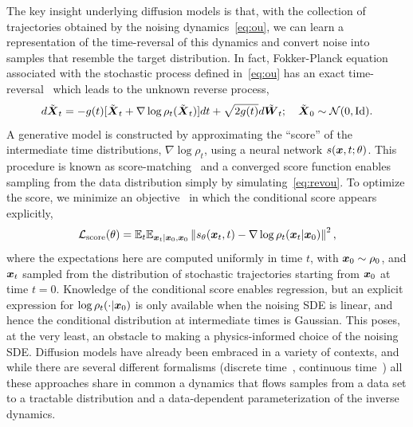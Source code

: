 \documentclass[11pt]{article}
\begin{document}
The key insight underlying diffusion models is that, with the collection of trajectories obtained by the noising dynamics~\eqref{eq:ou}, we can learn a representation of the time-reversal of this dynamics and convert noise into samples that resemble the target distribution.
In fact, Fokker-Planck equation associated with the stochastic process defined in~\eqref{eq:ou} has an exact time-reversal~\cite{anderson_reverse-time_1982,song_score-based_2022} which leads to the unknown reverse process,
\begin{equation}
    d\tilde{\boldsymbol{X}}_t = -g(t)[\tilde{\boldsymbol{X}}_t + \nabla \log \rho_t(\tilde{\boldsymbol{X}}_t)] dt + \sqrt{2 g(t)} d\tilde{\boldsymbol{W}}_t; \quad \tilde{\boldsymbol{X}}_0\sim \mathcal{N}(0,\rm{Id}).
    \label{eq:revou}
\end{equation}
A generative model is constructed by approximating the ``score'' of the intermediate time distributions, $\nabla \log \rho_t$, using a neural network $s(\boldsymbol{x}, t; \theta)$.
This procedure is known as score-matching~\cite{song_score-based_2022} and a converged score function enables sampling from the data distribution simply by simulating~\eqref{eq:revou}.
To optimize the score, we minimize an objective~\cite{song_score-based_2022} in which the conditional score appears explicitly,
\begin{equation}
    \mathcal{L}_{\rm score}(\theta) = \mathbb{E}_t \mathbb{E}_{\boldsymbol{x}_t| \boldsymbol{x}_0, \boldsymbol{x}_0} \left\| s_{\theta}(\boldsymbol{x}_t, t) - \nabla \log \rho_t (\boldsymbol{x}_t | \boldsymbol{x}_0) \right\|^2,
\end{equation}
where the expectations here are computed uniformly in time $t$, with $\boldsymbol{x}_0 \sim \rho_0$, and $\boldsymbol{x}_t$ sampled from the distribution of stochastic trajectories starting from $\boldsymbol{x}_0$ at time $t=0.$
Knowledge of the conditional score enables regression, but an explicit expression for $\log \rho_t (\cdot | \boldsymbol{x}_0)$ is only available when the noising SDE is linear, and hence the conditional distribution at intermediate times is Gaussian.
This poses, at the very least, an obstacle to making a physics-informed choice of the noising SDE. 
Diffusion models have already been embraced in a variety of contexts, and while there are several different formalisms (discrete time~\cite{ho_denoising_nodate}, continuous time~\cite{song_score-based_2022,vroylandt_likelihood-based_2022}) all these approaches share in common a dynamics that flows samples from a data set to a tractable distribution and a data-dependent parameterization of the inverse dynamics.
\end{document}
